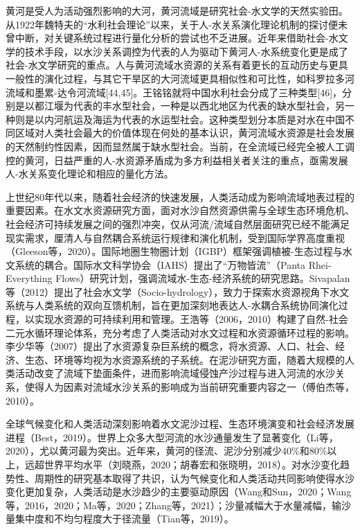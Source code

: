 
黄河是受人为活动强烈影响的大河，黄河流域是研究社会-水文学的天然实验田。从1922年魏特夫的“水利社会理论”以来，关于人-水关系演化理论机制的探讨便未曾中断，对关键系统过程进行量化分析的尝试也不乏进展。近年来借助社会-水文学的技术手段，以水沙关系调控为代表的人为驱动下黄河人-水系统变化更是成了社会-水文学研究的重点。人与黄河流域水资源的关系有着更长的互动历史与更具一般性的演化过程，与其它干旱区的大河流域更具相似性和可比性，如科罗拉多河流域和墨累-达令河流域[44,45]。王铭铭就将中国水利社会分成了三种类型[46]，分别是以都江堰为代表的丰水型社会，一种是以西北地区为代表的缺水型社会，另一种则是以内河航运及海运为代表的水运型社会。这种类型划分本质是对水在中国不同区域对人类社会最大的价值体现在何处的基本认识，黄河流域水资源是社会发展的天然制约性因素，因而显然属于缺水型社会。当前，在全流域已经完全被人工调控的黄河，日益严重的人-水资源矛盾成为多方利益相关者关注的重点，亟需发展人-水关系变化理论和相应的量化方法。

上世纪80年代以来，随着社会经济的快速发展，人类活动成为影响流域地表过程的重要因素。在水文水资源研究方面，面对水沙自然资源供需与全球生态环境危机、社会经济可持续发展之间的强烈冲突，仅从河流/流域自然层面研究已经不能满足现实需求，厘清人与自然耦合系统运行规律和演化机制，受到国际学界高度重视（Gleeson等，2020）。国际地圈生物圈计划（IGBP）框架强调植被-生态过程与水文系统的耦合。国际水文科学协会（IAHS）提出了“万物皆流”（Panta Rhei-Everything Flows）研究计划，强调流域水-生态-经济系统的研究思路。Sivapalan等（2012）提出了社会水文学（Socio-hydrology），致力于探索水资源视角下水文系统与人类系统的双向互馈机制，旨在更加深刻地表达人-水耦合系统协同演化过程，以实现水资源的可持续利用和管理。王浩等（2006，2010）构建了自然-社会二元水循环理论体系，充分考虑了人类活动对水文过程和水资源循环过程的影响。李少华等（2007）提出了水资源复杂巨系统的概念，将水资源、人口、社会、经济、生态、环境等均视为水资源系统的子系统。在泥沙研究方面，随着大规模的人类活动改变了流域下垫面条件，进而影响流域侵蚀产沙过程与进入河流的水沙关系，使得人为因素对流域水沙关系的影响成为当前研究重要内容之一（傅伯杰等，2010）。

全球气候变化和人类活动深刻影响着水文泥沙过程、生态环境演变和社会经济发展进程（Best，2019）。世界上众多大型河流的水沙通量发生了显著变化（Li等，2020），尤以黄河最为突出。近年来，黄河的径流、泥沙分别减少40\%和80\%以上，远超世界平均水平（刘晓燕，2020；胡春宏和张晓明，2018）。对水沙变化趋势性、周期性的研究基本取得了共识，认为气候变化和人类活动共同影响使得水沙变化更加复杂，人类活动是水沙趋少的主要驱动原因（Wang和Sun，2020；Wang等，2016，2020；Ma等，2020；Zhang等，2021）；沙量减幅大于水量减幅，输沙量集中度和不均匀程度大于径流量（Tian等，2019）。


